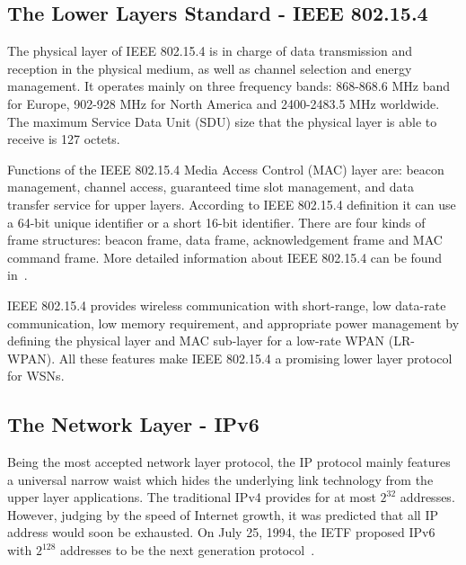 \subsection{The Lower Layers Standard - IEEE 802.15.4}
\label{General:WSN:IEEE}
The physical layer of IEEE 802.15.4 is in charge of data transmission and reception in the physical medium, as well as channel selection and energy management. It operates mainly on three frequency bands: 868-868.6 MHz band for Europe, 902-928 MHz for North America and 2400-2483.5 MHz worldwide. The maximum Service Data Unit (SDU) size that the physical layer is able to receive is 127 octets. 

Functions of the IEEE 802.15.4 Media Access Control (MAC) layer are: beacon management, channel access, guaranteed time slot management, and data transfer service for upper layers. According to IEEE 802.15.4 definition it can use a 64-bit unique identifier or a short 16-bit identifier. There are four kinds of frame structures: beacon frame, data frame, acknowledgement frame and MAC command frame. More detailed information about IEEE 802.15.4 can be found in~\cite{IEEE 802.15.4}.

IEEE 802.15.4 provides wireless communication with short-range, low data-rate communication, low memory requirement, and appropriate power management by defining the physical layer and MAC sub-layer for a low-rate WPAN (LR-WPAN)\@. All these features make IEEE 802.15.4 a promising lower layer protocol for WSNs. 

\subsection{The Network Layer - IPv6}
\label{General:WSN:IPv6}

Being the most accepted network layer protocol, the IP protocol mainly features a universal narrow waist which hides the underlying link technology from the upper layer applications. The traditional IPv4 provides for at most $2^{32}$ addresses. However, judging by the speed of Internet growth, it was predicted that all IP address would soon be exhausted. On July 25, 1994, the IETF proposed IPv6 with $2^{128}$ addresses to be the next generation protocol~\cite{RFC 1752}.


